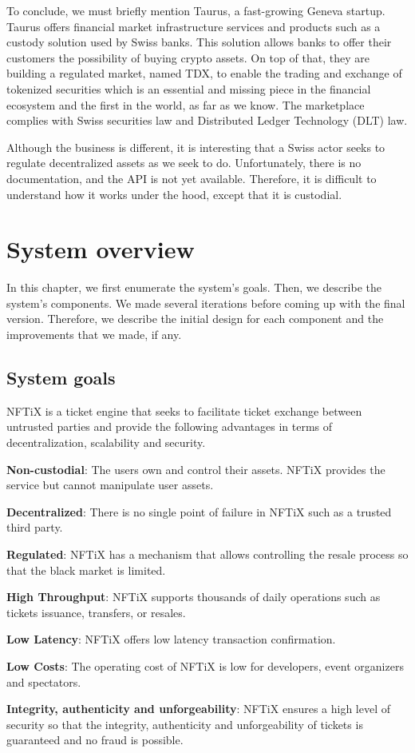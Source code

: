 \documentclass[a4paper,11pt,oneside]{report}
\begin{document}
To conclude, we must briefly mention Taurus, a fast-growing Geneva startup. Taurus offers financial market infrastructure services and products such as a custody solution used by Swiss banks. This solution allows banks to offer their customers the possibility of buying crypto assets. On top of that, they are building a regulated market, named TDX, to enable the trading and exchange of tokenized securities which is an essential and missing piece in the financial ecosystem and the first in the world, as far as we know. The marketplace complies with Swiss securities law and Distributed Ledger Technology (DLT) law.

Although the business is different, it is interesting that a Swiss actor seeks to regulate decentralized assets as we seek to do. Unfortunately, there is no documentation, and the API is not yet available. Therefore, it is difficult to understand how it works under the hood, except that it is custodial.

\chapter{System overview}
In this chapter, we first enumerate the system's goals. Then, we describe the system's components. We made several iterations before coming up with the final version. Therefore, we describe the initial design for each component and the improvements that we made, if any.

\section{System goals}
NFTiX is a ticket engine that seeks to facilitate ticket exchange between untrusted parties and provide the following advantages in terms of decentralization, scalability and security.

\begin{description}
  \item \textbf{Non-custodial}: The users own and control their assets. NFTiX provides the service but cannot manipulate user assets.
  \item \textbf{Decentralized}: There is no single point of failure in NFTiX such as a trusted third party.
  \item \textbf{Regulated}: NFTiX has a mechanism that allows controlling the resale process so that the black market is limited.
  \item \textbf{High Throughput}: NFTiX supports thousands of daily operations such as tickets issuance, transfers, or resales.
  \item \textbf{Low Latency}: NFTiX offers low latency transaction confirmation.
  \item \textbf{Low Costs}: The operating cost of NFTiX is low for developers, event organizers and spectators.
  \item \textbf{Integrity, authenticity and unforgeability}: NFTiX ensures a high level of security so that the integrity, authenticity and unforgeability of tickets is guaranteed and no fraud is possible.
\end{description}
\end{document}
